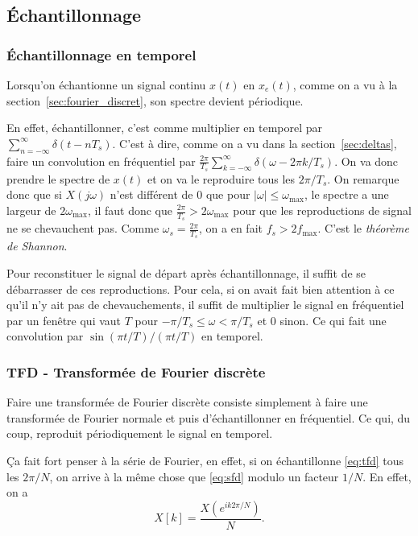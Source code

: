 \subsection{Échantillonnage}
\label{sec:sampling}
\subsubsection{Échantillonnage en temporel}
Lorsqu'on échantionne un signal continu $x(t)$ en $x_e(t)$,
comme on a vu à la section~\ref{sec:fourier_discret},
son spectre devient périodique.

En effet, échantillonner,
c'est comme multiplier en temporel par
$\sum_{n=-\infty}^{\infty} \delta(t-nT_s)$.
C'est à dire, comme on a vu dans la section~\ref{sec:deltas},
faire un convolution en fréquentiel par
$\frac{2\pi}{T_s}\sum_{k=-\infty}^\infty\delta(\omega-2\pi k/T_s)$.
On va donc prendre le spectre de $x(t)$ et on va le reproduire tous les
$2\pi/T_s$.
On remarque donc que si $X(j\omega)$ n'est différent de 0 que pour
$|\omega| \leq \omega_\mathrm{max}$,
le spectre a une largeur de $2\omega_\mathrm{max}$,
il faut donc que $\frac{2\pi}{T_s} > 2\omega_\mathrm{max}$ pour que les
reproductions de signal ne se chevauchent pas.
Comme $\omega_s = \frac{2\pi}{T_s}$, on a en fait $f_s > 2f_\mathrm{max}$.
C'est le \emph{théorème de Shannon}.

Pour reconstituer le signal de départ après échantillonnage,
il suffit de se débarrasser de ces reproductions.
Pour cela, si on avait fait bien attention à
ce qu'il n'y ait pas de chevauchements,
il suffit de multiplier le signal en fréquentiel par un fenêtre
qui vaut $T$ pour $-\pi/T_s \leq \omega < \pi/T_s$ et 0 sinon.
Ce qui fait une convolution par $\sin(\pi t/T)/(\pi t/T)$ en temporel.

\subsubsection{TFD - Transformée de Fourier discrète}
Faire une transformée de Fourier discrète consiste simplement à faire une
transformée de Fourier normale et puis d'échantillonner en fréquentiel.
Ce qui, du coup, reproduit périodiquement le signal en temporel.

Ça fait fort penser à la série de Fourier, en effet,
si on échantillonne \eqref{eq:tfd} tous les $2\pi/N$, on arrive
à la même chose que \eqref{eq:sfd} modulo un facteur $1/N$.
En effet, on a
\[ X[k] = \frac{X(e^{ik2\pi/N})}{N}. \]

